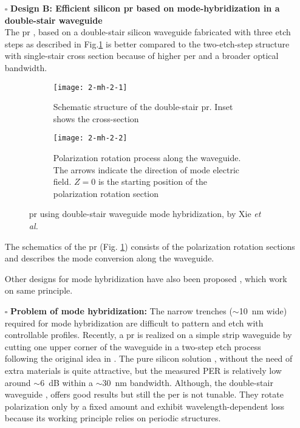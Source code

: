 \documentclass[../report.tex]{subfiles}
\begin{document}
\begin{itemize}[leftmargin=*]
	\item[$\square$] \textbf{Design B: Efficient silicon \gls{pr} based on mode-hybridization in a double-stair waveguide}\\
	The \gls{pr} \cite{xie_efficient_2015}, based on a double-stair silicon waveguide fabricated with three etch steps as described in Fig.\ref{fig:2_mh_2_1} is better compared to the two-etch-step structure with single-stair cross section \cite{aamer_cmos_2012} because of higher \gls{per} and a broader optical bandwidth. 
	\begin{figure}[H] %
		\begin{subfigure}[t]{0.45\textwidth}
			\texttt{[image: 2-mh-2-1]}
			\caption{Schematic structure of the double-stair \gls{pr}. Inset shows the cross-section}
			\label{fig:2_mh_2_1}
		\end{subfigure}
		\hfill
		\begin{subfigure}[t]{0.45\textwidth}
			\texttt{[image: 2-mh-2-2]}
			\caption{Polarization rotation process along the waveguide. The arrows indicate the direction of mode electric field. $Z = 0$ is the starting position of the polarization rotation section}
			\label{fig:2_mh_2_2}
		\end{subfigure}
		\caption{\gls{pr} using double-stair waveguide mode hybridization, by Xie \textit{et al.} \cite{xie_efficient_2015}}
	\end{figure}
	\noindent The schematics of the \gls{pr} (Fig. \ref{fig:2_mh_2_1}) consists of the polarization rotation sections and describes the mode conversion along the waveguide.\par
	
	Other designs for mode hybridization have also been proposed \cite{fukuda_integrated_2008,vermeulen_Silicon_2012}, which work on same principle.
	
	\item[$\square$] \textbf{Problem of mode hybridization:} The narrow trenches ($\sim$\SI{10}{\nano\meter} wide) required for mode hybridization are difficult to pattern and etch with controllable profiles. Recently, a \gls{pr} \cite{aamer_cmos_2012} is realized on a simple strip waveguide by cutting one upper corner of the waveguide in a two-step etch process following the original idea in \cite{wang_ultrasmall_2008}. The pure silicon solution \cite{aamer_cmos_2012}, without the need of extra materials is quite attractive, but the measured PER is relatively low around $\sim$\SI{6}{\deci\bel} within a $\sim$\SI{30}{\nano\meter} bandwidth. Although, the double-stair waveguide \cite{xie_efficient_2015}, offers good results but still the \gls{per} is not tunable. They rotate polarization only by a fixed amount and exhibit wavelength-dependent loss because its working principle relies on periodic structures.
			
\end{itemize}
		
\end{document}
